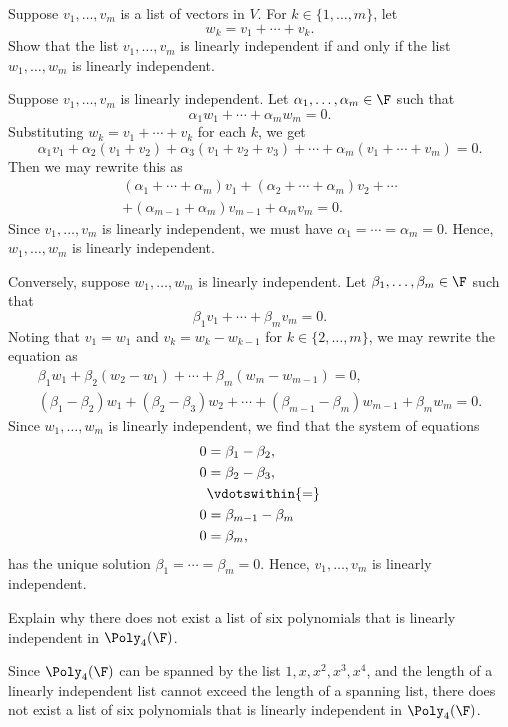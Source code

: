 \begin{exercise}
Suppose $v_1,\dots,v_m$ is a list of vectors in $V$. For $k\in\{1,\dots,m\}$,
let
\[ w_k = v_1+\cdots+v_k. \]
Show that the list $v_1,\dots,v_m$ is linearly independent if and only if the
list $w_1,\dots,w_m$ is linearly independent.
\end{exercise}
\begin{solution}
Suppose $v_1,\dots,v_m$ is linearly independent. Let
$\alpha_1,\dots,\alpha_m\in\F$ such that
\[ \alpha_1w_1+\cdots+\alpha_mw_m=0. \]
Substituting $w_k=v_1+\cdots+v_k$ for each $k$, we get
\[ \alpha_1v_1+\alpha_2(v_1+v_2)+\alpha_3(v_1+v_2+v_3)+\cdots
   +\alpha_m(v_1+\cdots+v_m)=0. \]
Then we may rewrite this as
\begin{multline*}
(\alpha_1+\cdots+\alpha_m)v_1+(\alpha_2+\cdots+\alpha_m)v_2+\cdots\\
+(\alpha_{m-1}+\alpha_m)v_{m-1}+\alpha_mv_m=0.
\end{multline*}
Since $v_1,\dots,v_m$ is linearly independent, we must have
$\alpha_1=\cdots=\alpha_m=0$. Hence, $w_1,\dots,w_m$ is linearly independent.

Conversely, suppose $w_1,\dots,w_m$ is linearly independent. Let
$\beta_1,\dots,\beta_m\in\F$ such that
\[ \beta_1v_1+\cdots+\beta_mv_m=0. \]
Noting that $v_1=w_1$ and $v_k=w_k-w_{k-1}$ for $k\in\{2,\dots,m\}$, we may
rewrite the equation as
\begin{gather*}
\beta_1w_1+\beta_2(w_2-w_1)+\cdots+\beta_m(w_m-w_{m-1})=0,\\
(\beta_1-\beta_2)w_1+(\beta_2-\beta_3)w_2+\cdots+(\beta_{m-1}-\beta_m)w_{m-1}
+\beta_mw_m=0.
\end{gather*}
Since $w_1,\dots,w_m$ is linearly independent, we find that the system of
equations
\begin{align*}
0 &= \beta_1-\beta_2,\\
0 &= \beta_2-\beta_3,\\
  &\vdotswithin{=}\\
0 &= \beta_{m-1}-\beta_m\\
0 &= \beta_m,
\end{align*}
has the unique solution $\beta_1=\cdots=\beta_m=0$. Hence, $v_1,\dots,v_m$ is
linearly independent.
\end{solution}

\begin{exercise}
Explain why there does not exist a list of six polynomials that is linearly
independent in $\Poly_4(\F)$.
\end{exercise}
\begin{solution}
Since $\Poly_4(\F)$ can be spanned by the list $1,x,x^2,x^3,x^4$, and the
length of a linearly independent list cannot exceed the length of a spanning
list, there does not exist a list of six polynomials that is linearly
independent in $\Poly_4(\F)$.
\end{solution}

